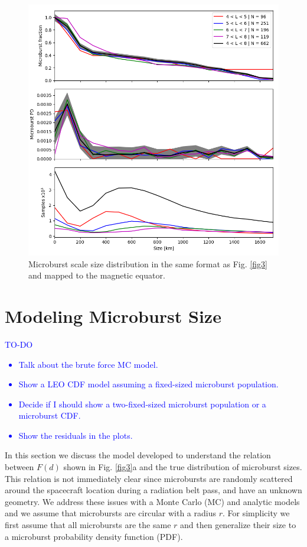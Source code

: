 \documentclass[draft]{agujournal2019}
\begin{document}
\begin{figure}
\includegraphics[width=\textwidth]{fig4.png}
\caption{Microburst scale size distribution in the same format as Fig. \ref{fig3} and mapped to the magnetic equator.} 
\label{fig4}
\end{figure}

\section{Modeling Microburst Size}
\textcolor{blue}{
TO-DO
\begin{itemize}
\item Talk about the brute force MC model.
\item Show a LEO CDF model assuming a fixed-sized microburst population.
\item Decide if I should show a two-fixed-sized microburst population or a microburst CDF.
\item Show the residuals in the plots.
\end{itemize}
}

In this section we discuss the model developed to understand the relation between $F(d)$ shown in Fig. \ref{fig3}a and the true distribution of microburst sizes. This relation is not immediately clear since microbursts are randomly scattered around the spacecraft location during a radiation belt pass, and have an unknown geometry. We address these issues with a Monte Carlo (MC) and analytic models and we assume that microbursts are circular with a radius $r$. For simplicity we first assume that all microbursts are the same $r$ and then generalize their size to a microburst probability density function (PDF). 
\end{document}
